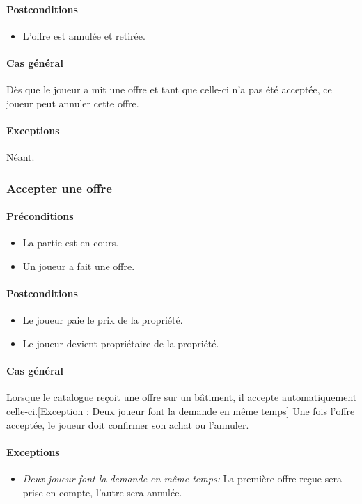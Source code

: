 \documentclass[a4paper,11pt]{report}
\begin{document}
\paragraph{Postconditions}
\begin{itemize}
 \item L'offre est annulée et retirée.
\end{itemize}
\paragraph{Cas général}
Dès que le joueur a mit une offre et tant que celle-ci n'a pas été acceptée, ce joueur peut annuler cette offre.
\paragraph{Exceptions} Néant.

\subsubsection{Accepter une offre}
\paragraph{Préconditions}
\begin{itemize}
 \item La partie est en cours.
 \item Un joueur a fait une offre.
\end{itemize}
\paragraph{Postconditions}
\begin{itemize}
 \item Le joueur paie le prix de la propriété.
 \item Le joueur devient propriétaire de la propriété.
\end{itemize}
\paragraph{Cas général}
Lorsque le catalogue reçoit une offre sur un bâtiment, il accepte automatiquement celle-ci.[Exception : Deux joueur font la demande en même temps] Une fois l'offre acceptée, le joueur doit confirmer son achat ou l'annuler.
\paragraph{Exceptions}
\begin{itemize}
 \item \textit{Deux joueur font la demande en même temps:} La première offre reçue sera prise en compte, l'autre sera annulée.
\end{itemize}
\end{document}
